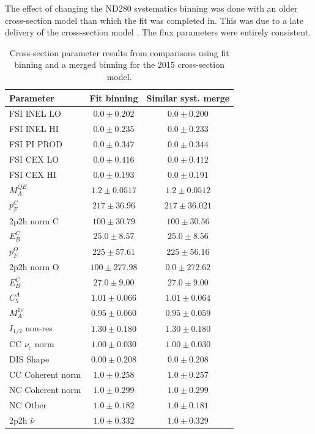 The effect of changing the ND280 systematics binning was done with an older cross-section model than which the fit was completed in. This was due to a late delivery of the cross-section model . The flux parameters were entirely consistent.
\begin{table}
	\centering
	\begin{tabular}{ l | c | c }
		\hline
		Parameter & Fit binning & Similar syst. merge \\
		\hline
		\hline
		FSI INEL LO & $0.0 \pm 0.202$ & $0.0\pm0.200$ \\
		FSI INEL HI & $0.0 \pm 0.235$ & $0.0\pm0.233$ \\
		FSI PI PROD & $0.0 \pm 0.347$ & $0.0\pm0.344$ \\
		FSI CEX LO  & $0.0 \pm 0.416$ & $0.0\pm0.412$ \\
		FSI CEX HI  & $0.0 \pm 0.193$ & $0.0\pm0.191$ \\
		$M_A^{QE}$  & $1.2 \pm 0.0517$ & $1.2\pm0.0512$ \\
		$p_F^{C}$   & $217 \pm 36.96$ & $217\pm36.021$ \\
		2p2h norm C & $100 \pm 30.79$ & $100\pm30.56$ \\
		$E_B^{C}$   & $25.0 \pm 8.57$ & $25.0\pm8.56$ \\
		$p_F^{O}$   & $225 \pm 57.61$  & $225\pm56.16$ \\
		2p2h norm O & $100 \pm 277.98$ & $0.0\pm272.62$ \\
		$E_B^{C}$   & $27.0 \pm 9.00$ & $27.0\pm9.00$ \\
		$C_5^A$		& $1.01 \pm 0.066$ & $1.01\pm0.064$ \\
		$M_A^{1\pi}$ & $0.95 \pm 0.060$ & $0.95\pm0.059$ \\
		$I_{1/2}$ non-res & $1.30 \pm 0.180$ & $1.30\pm0.180$ \\
		CC $\nu_e$ norm & $1.00 \pm 0.030$ & $1.00\pm0.030$ \\
		DIS Shape	& $0.00 \pm 0.208$ & $0.0\pm0.208$ \\
		CC Coherent norm & $1.0 \pm 0.258$ & $1.0\pm0.257$ \\
		NC Coherent norm & $1.0 \pm 0.299$ & $1.0\pm0.299$ \\
		NC Other & $1.0 \pm 0.182$ & $1.0\pm0.181$ \\
		2p2h $\bar{\nu}$ & $1.0 \pm 0.332$ & $1.0\pm0.329$ \\
		\hline
	\end{tabular}
	\caption{Cross-section parameter results from comparisons using fit binning and a merged binning for the 2015 cross-section model.}
\label{fig:2017_rebin_asimov}
\end{table}

